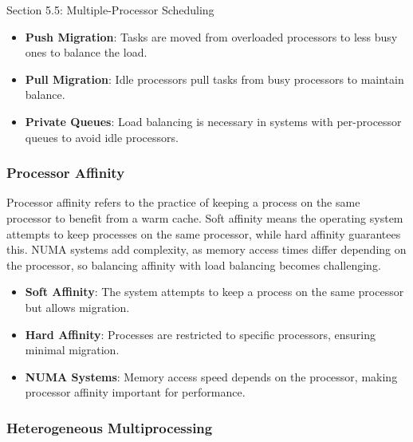 \begin{notes}{Section 5.5: Multiple-Processor Scheduling}
\begin{highlight}
        \begin{itemize}
            \item \textbf{Push Migration}: Tasks are moved from overloaded processors to less busy ones to balance the load.
            \item \textbf{Pull Migration}: Idle processors pull tasks from busy processors to maintain balance.
            \item \textbf{Private Queues}: Load balancing is necessary in systems with per-processor queues to avoid idle processors.
        \end{itemize}
    
    \end{highlight}
    
    \subsubsection*{Processor Affinity}
    
    Processor affinity refers to the practice of keeping a process on the same processor to benefit from a warm cache. Soft affinity means the operating system attempts to keep processes on the same 
    processor, while hard affinity guarantees this. NUMA systems add complexity, as memory access times differ depending on the processor, so balancing affinity with load balancing becomes challenging.
    
    \begin{highlight}
    
        \begin{itemize}
            \item \textbf{Soft Affinity}: The system attempts to keep a process on the same processor but allows migration.
            \item \textbf{Hard Affinity}: Processes are restricted to specific processors, ensuring minimal migration.
            \item \textbf{NUMA Systems}: Memory access speed depends on the processor, making processor affinity important for performance.
        \end{itemize}
    
    \end{highlight}
    
    \subsubsection*{Heterogeneous Multiprocessing}
    

\end{notes}
